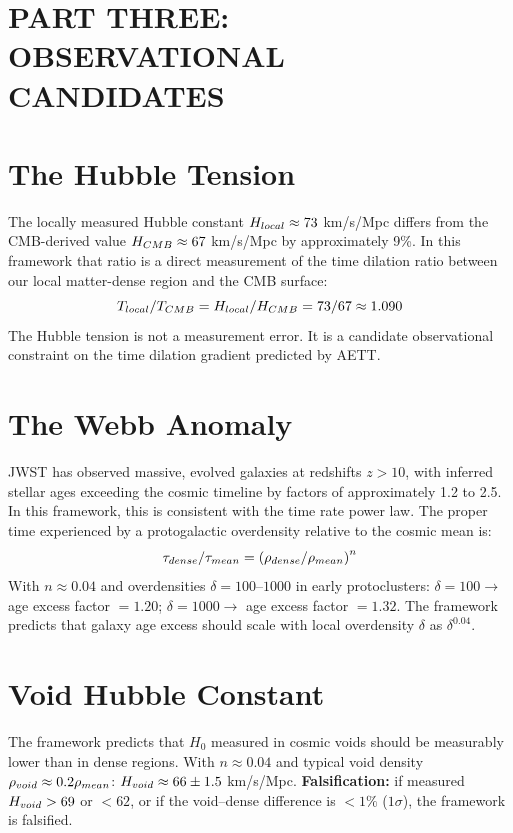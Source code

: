 \documentclass[11pt,a4paper]{article}
\def\frac#1#2{#1/#2} \def\phantom#1{} \def\ensuremath#1{#1}
\let\text\relax \let\mathrm\relax \let\mathbf\relax \let\mathcal\relax
\begin{document}
\section*{PART THREE: OBSERVATIONAL CANDIDATES}

\section{The Hubble Tension}
The locally measured Hubble constant $H_{\text{local}} \approx 73$ km/s/Mpc differs from the CMB-derived value $H_{\text{CMB}} \approx 67$ km/s/Mpc by approximately 9\%. In this framework that ratio is a direct measurement of the time dilation ratio between our local matter-dense region and the CMB surface:
\begin{equation}
\frac{T_{\text{local}}}{T_{\text{CMB}}} = \frac{H_{\text{local}}}{H_{\text{CMB}}} = \frac{73}{67} \approx 1.090
\end{equation}
The Hubble tension is not a measurement error. It is a candidate observational constraint on the time dilation gradient predicted by AETT.

\section{The Webb Anomaly}
JWST has observed massive, evolved galaxies at redshifts $z > 10$, with inferred stellar ages exceeding the cosmic timeline by factors of approximately 1.2 to 2.5. In this framework, this is consistent with the time rate power law. The proper time experienced by a protogalactic overdensity relative to the cosmic mean is:
\begin{equation}
\frac{\tau_{\text{dense}}}{\tau_{\text{mean}}} = \left(\frac{\rho_{\text{dense}}}{\rho_{\text{mean}}}\right)^n
\end{equation}
With $n \approx 0.04$ and overdensities $\delta = 100$--$1000$ in early protoclusters: $\delta = 100 \to$ age excess factor $= 1.20$; $\delta = 1000 \to$ age excess factor $= 1.32$. The framework predicts that galaxy age excess should scale with local overdensity $\delta$ as $\delta^{0.04}$.

\section{Void Hubble Constant}
The framework predicts that $H_0$ measured in cosmic voids should be measurably lower than in dense regions. With $n \approx 0.04$ and typical void density $\rho_{\text{void}} \approx 0.2 \rho_{\text{mean}}$: $H_{\text{void}} \approx 66 \pm 1.5$ km/s/Mpc. \textbf{Falsification:} if measured $H_{\text{void}} > 69$ or $< 62$, or if the void--dense difference is $< 1\%$ ($1\sigma$), the framework is falsified.
\end{document}
